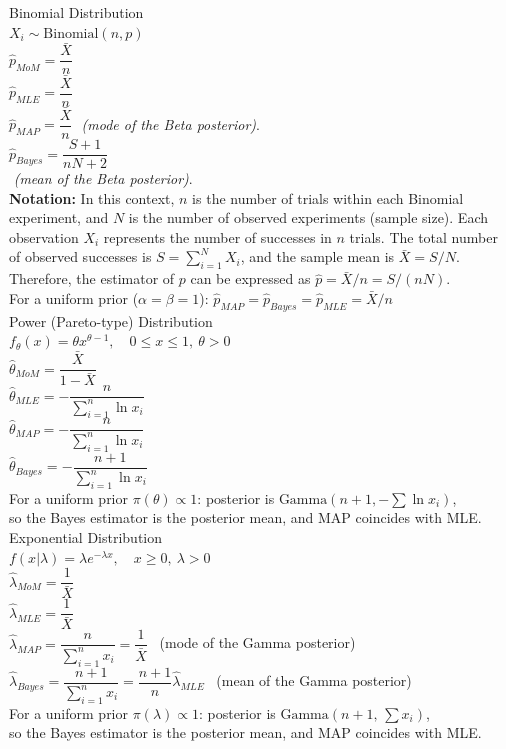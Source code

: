 Binomial Distribution\\
$X_i \sim \text{Binomial}(n, p)$\\
$\hat{p}_{MoM} = \dfrac{\bar{X}}{n}$\\
$\hat{p}_{MLE} = \dfrac{\bar{X}}{n}$\\
$\hat{p}_{MAP} = \dfrac{\bar{X}}{n}$ \,\,\textit{(mode of the Beta posterior)}.\\
$\hat{p}_{Bayes} = \dfrac{S+1}{nN+2}$\\\,\,\textit{(mean of the Beta posterior)}.\\
\textbf{Notation:} In this context, $n$ is the number of trials within each Binomial experiment, and $N$ is the number of observed experiments (sample size). Each observation $X_i$ represents the number of successes in $n$ trials. The total number of observed successes is $S = \sum_{i=1}^{N} X_i$, and the sample mean is $\bar{X} = S / N$. Therefore, the estimator of $p$ can be expressed as $\hat{p} = \bar{X}/n = S / (nN)$.\\
For a uniform prior ($\alpha=\beta=1$): $\hat{p}_{MAP} = \hat{p}_{Bayes} = \hat{p}_{MLE} = \bar{X}/n$\\

Power (Pareto-type) Distribution\\
$f_\theta(x) = \theta x^{\theta - 1}, \quad 0 \le x \le 1, \ \theta > 0$\\
$\hat{\theta}_{MoM} = \dfrac{\bar{X}}{1 - \bar{X}}$\\
$\hat{\theta}_{MLE} = -\dfrac{n}{\sum_{i=1}^{n} \ln x_i}$\\
$\hat{\theta}_{MAP} = -\dfrac{n}{\sum_{i=1}^{n} \ln x_i}$\\
$\hat{\theta}_{Bayes} = -\dfrac{n + 1}{\sum_{i=1}^{n} \ln x_i}$\\
For a uniform prior $\pi(\theta)\propto1$: posterior is $\text{Gamma}(n+1, -\sum \ln x_i)$,\\
so the Bayes estimator is the posterior mean, and MAP coincides with MLE.\\

Exponential Distribution\\
$f(x|\lambda) = \lambda e^{-\lambda x}, \quad x \ge 0, \ \lambda > 0$\\
$\hat{\lambda}_{MoM} = \dfrac{1}{\bar{X}}$\\
$\hat{\lambda}_{MLE} = \dfrac{1}{\bar{X}}$\\
$\hat{\lambda}_{MAP} = \dfrac{n}{\sum_{i=1}^{n} x_i} = \dfrac{1}{\bar{X}}$ \ (mode of the Gamma posterior)\\
$\hat{\lambda}_{Bayes} = \dfrac{n + 1}{\sum_{i=1}^{n} x_i} = \dfrac{n + 1}{n} \hat{\lambda}_{MLE}$ \ (mean of the Gamma posterior)\\
For a uniform prior $\pi(\lambda)\propto1$: posterior is $\text{Gamma}(n+1,\,\sum x_i)$,\\
so the Bayes estimator is the posterior mean, and MAP coincides with MLE.\\

